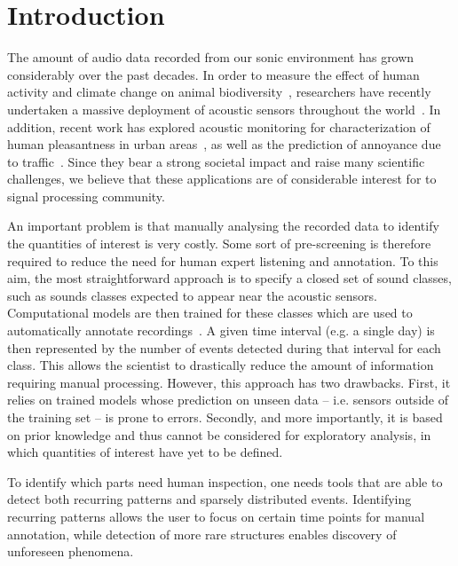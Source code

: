 \documentclass[smallextended]{svjour3}
\makeatletter
\newcommand*{\eg}{e.g.\@\xspace}
\newcommand*{\ie}{i.e.\@\xspace}
\makeatother
\begin{document}
\section{Introduction}

The amount of audio data recorded from our sonic environment has grown considerably over the past decades.
In order to measure the effect of human activity and climate change on animal biodiversity~\cite{sueur2015ecoacoustics}, researchers have recently undertaken a massive deployment of acoustic sensors throughout the world~\cite{warren2006urban, NessSST13, stowell13b}.
In addition, recent work has explored acoustic monitoring for characterization of human pleasantness in urban areas~\cite{guyot2005urban, ricciardi2015sound}, as well as the prediction of annoyance due to traffic~\cite{gloaguen}.
Since they bear a strong societal impact and raise many scientific challenges, we believe that these applications are of considerable interest for to signal processing community.


An important problem is that manually analysing the recorded data to identify the quantities of interest is very costly. Some sort of pre-screening is therefore required to reduce the need for human expert listening and annotation.
To this aim, the most straightforward approach is to specify a closed set of sound classes, such as sounds classes expected to appear near the acoustic sensors. Computational models are then trained  for these classes which are used to automatically annotate recordings~\cite{quteprints96243}. A given time interval (\eg{} a single day) is then represented by the number of events detected during that interval for each class. This allows the scientist to drastically reduce the amount of information requiring manual processing. However, this approach has two drawbacks. First, it relies on trained models whose prediction on unseen data -- \ie{} sensors outside of the training set -- is prone to errors. Secondly, and more importantly, it is based on prior knowledge and thus cannot be considered for exploratory analysis, in which quantities of interest have yet to be defined.

To identify which parts need human inspection, one needs tools that are able to detect both recurring patterns and sparsely distributed events. Identifying recurring patterns allows the user to focus on certain time points for manual annotation, while detection of more rare structures enables discovery of unforeseen phenomena.
\end{document}
